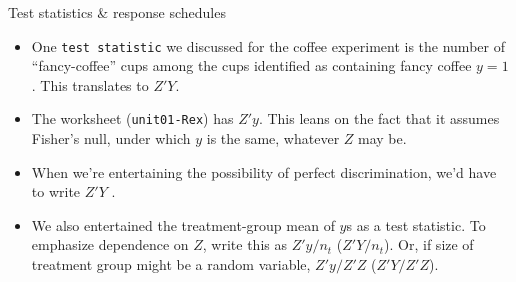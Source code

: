 \begin{frame}{Test statistics \& response schedules}
  
\begin{itemize}
\item One \texttt{test statistic} we discussed for the coffee experiment is the number of ``fancy-coffee'' cups among the cups identified as containing fancy coffee $y=1$. This translates to $Z'Y$. \pause


\item The worksheet (\texttt{unit01-Rex}) has $Z'y$.  This leans on the fact that it assumes Fisher's null, under which $y$ is the same, whatever $Z$ may be. \pause

\item When we're entertaining the possibility of perfect discrimination, we'd have to write $Z'Y$ .
\item We also entertained the treatment-group mean of $y$s as a test statistic. To emphasize dependence on $Z$, write this as $Z'y/n_{t}$ ($Z'Y/n_{t}$). Or, if size of treatment group might be a random variable, $Z'y/Z'Z$ ($Z'Y/Z'Z$).
\end{itemize}
\end{frame}

